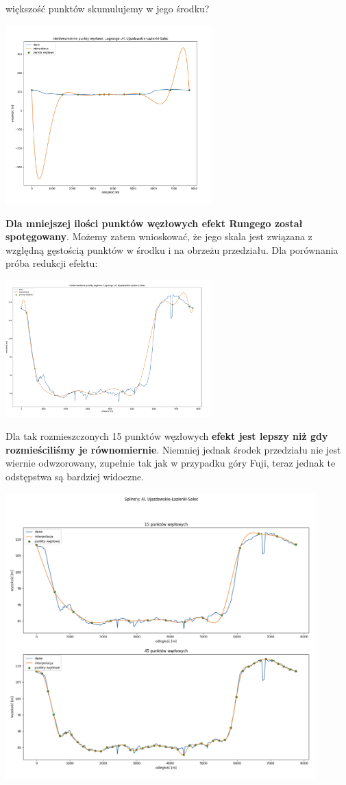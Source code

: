 \documentclass{article}
\begin{document}
większość punktów skumulujemy w jego środku?
 \begin{center}
	\includegraphics[width=8cm]{lagrange_wwa_runge_magnified}
\end{center}
\textbf{Dla mniejszej ilości punktów węzłowych efekt Rungego został spotęgowany}. Możemy zatem wnioskować, że jego skala jest związana z względną gęstością punktów
w środku i na obrzeżu przedziału. Dla porównania próba redukcji efektu:
 \begin{center}
	\includegraphics[width=8cm]{lagrange_wwa_runge}
\end{center}
Dla tak rozmieszczonych 15 punktów węzłowych \textbf{efekt jest lepszy niż gdy rozmieściliśmy je równomiernie}. 
Niemniej jednak środek przedziału nie jest wiernie odwzorowany, zupełnie tak jak w przypadku góry Fuji, teraz jednak te odstępstwa są bardziej widoczne.
 \begin{center}
	\includegraphics[width=12cm]{spline_wwa_uniform}
\end{center}
\end{document}
